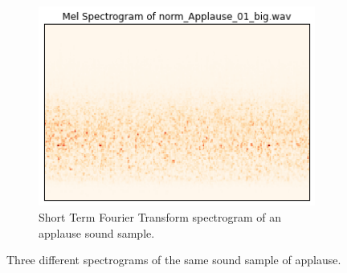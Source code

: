 \documentclass{sig-alternate-05-2015}
\begin{document}
\begin{figure}[hbt!]
\begin{subfigure}[b]{0.3\textwidth}
      \centering
      \includegraphics[width=\textwidth]{figures/mel_applause.png}
      \caption{Short Term Fourier Transform spectrogram of an applause sound sample.}
      \label{fig:cqt-applause}
    \end{subfigure}
    
    \caption{Three different spectrograms of the same sound sample of applause.}
    \label{fig:spectrogramCompare}
  \end{figure}
  
\end{document}
